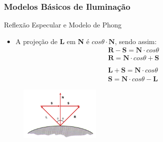 \documentclass{beamer}
\begin{document}
\begin{frame}
\frametitle{Modelos Básicos de Iluminação}

	\begin{block}{Reflexão Especular e Modelo de Phong}
		\begin{itemize}
			\item A projeção de \textbf{L} em \textbf{N} é $cos \theta \cdot \textbf{N}$, sendo assim:
			\begin{eqnarray*}
				\textbf{R} - \textbf{S} = \textbf{N} \cdot cos \theta\\
				\textbf{R} = \textbf{N} \cdot cos \theta + \textbf{S}\\
				\\
				\textbf{L} + \textbf{S} = \textbf{N} \cdot cos \theta\\
				\textbf{S} = \textbf{N} \cdot cos \theta - \textbf{L}
			\end{eqnarray*}
		\end{itemize}
	\end{block}
	
	\begin{figure}[!h]
		\begin{center}
		\includegraphics[width=0.35\textwidth]{Figures/ProRef}
		\end{center}
	\end{figure}	
\end{frame}
\end{document}
